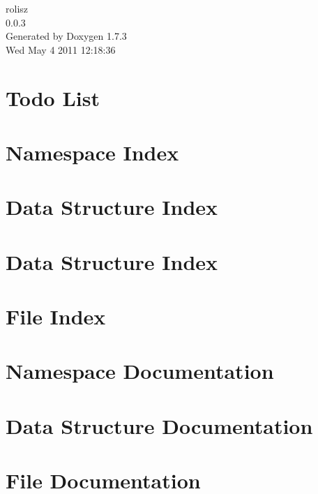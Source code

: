 \documentclass[a4paper]{book}
\begin{document}
\begin{titlepage}
\vspace*{7cm}
\begin{center}
{\Large rolisz \\[1ex]\large 0.0.3 }\\
\vspace*{1cm}
{\large Generated by Doxygen 1.7.3}\\
\vspace*{0.5cm}
{\small Wed May 4 2011 12:18:36}\\
\end{center}
\end{titlepage}
\clearemptydoublepage
{}
\tableofcontents
\clearemptydoublepage
{}
\chapter{Todo List}
\label{todo}

\chapter{Namespace Index}

\chapter{Data Structure Index}

\chapter{Data Structure Index}

\chapter{File Index}

\chapter{Namespace Documentation}


\chapter{Data Structure Documentation}












\chapter{File Documentation}











\printindex
\end{document}
